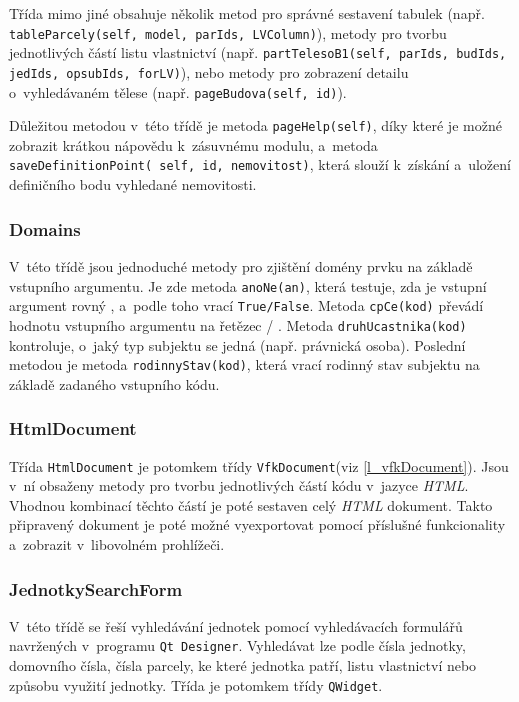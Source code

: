 \documentclass[a4paper,12pt,oneside]{book}
\begin{document}
Třída mimo jiné obsahuje několik metod pro správné sestavení tabulek (např. \texttt{tableParcely(self, model, parIds, LVColumn)}), metody pro tvorbu jednotlivých částí listu vlastnictví (např. \texttt{partTelesoB1(self, parIds, budIds, jedIds, opsubIds, forLV)}), nebo metody pro zobrazení detailu o~vyhledávaném tělese (např. \texttt{pageBudova(self, id)}).

Důležitou metodou v~této třídě je metoda \texttt{pageHelp(self)}, díky které je možné zobrazit krátkou nápovědu k~zásuvnému modulu, a~metoda \texttt{saveDefinitionPoint( self, id, nemovitost)}, která slouží k~získání a~uložení definičního bodu vyhledané nemovitosti.

\subsubsection{Domains}
V~této třídě jsou jednoduché metody pro zjištění domény prvku na základě vstupního argumentu. Je zde metoda \texttt{anoNe(an)}, která testuje, zda je vstupní argument rovný , a~podle toho vrací \texttt{True/False}. Metoda \texttt{cpCe(kod)} převádí hodnotu vstupního argumentu na řetězec  / . Metoda \texttt{druhUcastnika(kod)} kontroluje, o~jaký typ subjektu se jedná (např. právnická osoba). Poslední metodou je metoda \texttt{rodinnyStav(kod)}, která vrací rodinný stav subjektu na základě zadaného vstupního kódu.

\subsubsection{HtmlDocument}
Třída \texttt{HtmlDocument} je potomkem třídy \texttt{VfkDocument}(viz \ref{l_vfkDocument}). Jsou v~ní obsaženy metody pro tvorbu jednotlivých částí kódu v~jazyce \textit{HTML}. Vhodnou kombinací těchto částí je poté sestaven celý \textit{HTML} dokument. Takto připravený dokument je poté možné vyexportovat pomocí příslušné funkcionality a~zobrazit v~libovolném prohlížeči.

\subsubsection{JednotkySearchForm}
V~této třídě se řeší vyhledávání jednotek pomocí vyhledávacích formulářů navržených v~programu \texttt{Qt Designer}. Vyhledávat lze podle čísla jednotky, domovního čísla, čísla parcely, ke které jednotka patří, listu vlastnictví nebo způsobu využití jednotky. Třída je potomkem třídy \texttt{QWidget}.
\end{document}
